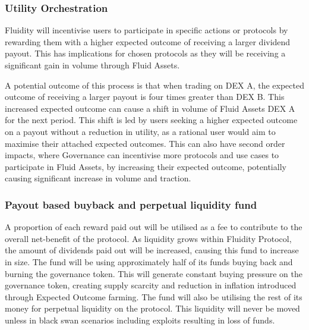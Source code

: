 \subsubsection{Utility Orchestration}

Fluidity will incentivise users to participate in specific actions or protocols by rewarding them with a higher expected outcome of receiving a larger dividend payout. This has implications for chosen protocols as they will be receiving a significant gain in volume through Fluid Assets.

A potential outcome of this process is that when trading on DEX A, the expected outcome of receiving a larger payout is four times greater than DEX B. This increased expected outcome can cause a shift in volume of Fluid Assets DEX A for the next period. This shift is led by users seeking a higher expected outcome on a payout without a reduction in utility, as a rational user would aim to maximise their attached expected outcomes.
This can also have second order impacts, where Governance can incentivise more protocols and use cases to participate in Fluid Assets, by increasing their expected outcome, potentially causing significant increase in volume and traction.


\subsubsection{Payout based buyback and perpetual liquidity fund}


A proportion of each reward paid out will be utilised as a fee to contribute to the overall net-benefit of the protocol. As liquidity grows within Fluidity Protocol, the amount of dividends paid out will be increased, causing this fund to increase in size. The fund will be using approximately half of its funds buying back and burning the governance token. This will generate constant buying pressure on the governance token, creating supply scarcity and reduction in inflation introduced through Expected Outcome farming. The fund will also be utilising the rest of its money for perpetual liquidity on the protocol. This liquidity will never be moved unless in black swan scenarios including exploits resulting in loss of funds.
